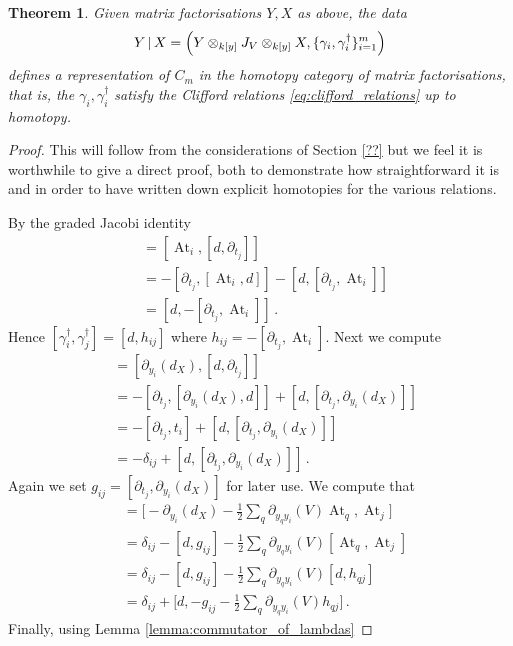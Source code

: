 \documentclass[english,letter paper,12pt,leqno]{article}
\newtheorem{theorem}{Theorem}[section]
\theoremstyle{example}
\numberwithin{equation}{section}
\def\be{\begin{equation}}
\def\ee{\end{equation}}
\DeclareMathOperator{\At}{At}
\begin{document}
\begin{theorem} Given matrix factorisations $Y,X$ as above, the data
\be
Y \l X = \left( Y \otimes_{k[y]} J_V \otimes_{k[y]} X, \{ \gamma_i, \gamma_i^\dagger \}_{i=1}^m \right)
\ee
defines a representation of $C_m$ in the homotopy category of matrix factorisations, that is, the $\gamma_i, \gamma_i^\dagger$ satisfy the Clifford relations \eqref{eq:clifford_relations}
up to homotopy.
\end{theorem}
\begin{proof}
This will follow from the considerations of Section \ref{??} but we feel it is worthwhile to give a direct proof, both to demonstrate how straightforward it is and in order to have written down explicit homotopies for the various relations.

By the graded Jacobi identity
\begin{align*}
[\At_i, \At_j] &= [\At_i, [d, \partial_{t_j}]]\\
&= - [\partial_{t_j}, [\At_i, d]] - [d, [\partial_{t_j}, \At_i]]\\
&= [d, -[\partial_{t_j}, \At_i]]\,.
\end{align*}
Hence $[\gamma_i^\dagger, \gamma_j^\dagger] = [d, h_{ij}]$ where $h_{ij} = - [ \partial_{t_j}, \At_i ]$. Next we compute
\begin{align*}
[\partial_{y_i}(d_X), \At_j] &= [\partial_{y_i}(d_X), [d, \partial_{t_j}]]\\
&= -[\partial_{t_j}, [\partial_{y_i}(d_X), d]] + [d, [\partial_{t_j}, \partial_{y_i}(d_X)]]\\
&= -[\partial_{t_j}, t_i] + [d, [\partial_{t_j}, \partial_{y_i}(d_X)]]\\
&= -\delta_{ij} + [d, [\partial_{t_j}, \partial_{y_i}(d_X)]]\,.
\end{align*}
Again we set $g_{ij} = [\partial_{t_j}, \partial_{y_i}(d_X)]$ for later use. We compute that
\begin{align*}
[ \gamma_i, \gamma^\dagger_j] &= \big[- \partial_{y_i}(d_X) - \frac{1}{2} \sum_q \partial_{y_q y_i}(V) \At_{q}, \At_j \big]\\
&= \delta_{ij} - [d, g_{ij}] - \frac{1}{2} \sum_q \partial_{y_qy_i}(V) [ \At_q, \At_j]\\
&= \delta_{ij} - [d, g_{ij}] - \frac{1}{2} \sum_q \partial_{y_qy_i}(V) [d, h_{qj}]\\
&= \delta_{ij} + \big[d, -g_{ij} - \frac{1}{2} \sum_q \partial_{y_qy_i}(V) h_{qj}\big]\,.
\end{align*}
Finally, using Lemma \ref{lemma:commutator_of_lambdas}

\end{proof}
\end{document}
